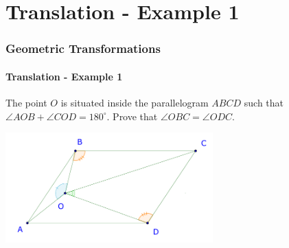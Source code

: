 \documentclass[8pt,xcolor=table,dvipsnames]{beamer}
\begin{document}
\section{Translation - Example 1}

\begin{frame}[t]
    \frametitle{Geometric Transformations}
    \framesubtitle{Translation - Example 1}
    \begin{example}
        The point $O$ is situated inside the parallelogram $ABCD$ such that $\angle AOB+\angle COD=180^{\circ}$.
        Prove that $\angle OBC=\angle ODC$.
    \end{example}

    \bigbreak
    \begin{center}
        \includegraphics[width=8cm]{./svg/pdf/canada-mo-1997-4-0.pdf}
    \end{center}
\end{frame}
\end{document}
